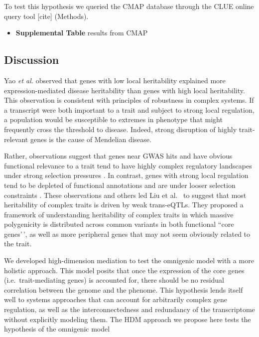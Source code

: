\documentclass[
]{article}
\providecommand{\tightlist}{%
  \setlength{\itemsep}{0pt}\setlength{\parskip}{0pt}}
\begin{document}
To test this hypothesis we queried the CMAP database through the CLUE
online query tool {[}cite{]} (Methods).

\begin{itemize}
\tightlist
\item
  \textbf{Supplemental Table} results from CMAP
\end{itemize}

\subsection{Discussion}\label{discussion}

Yao \textit{et al.} \cite{pmid32424349} observed that genes with low
local heritability explained more expression-mediated disease
heritability than genes with high local heritability. This observation
is consistent with principles of robustness in complex systems. If a
transcript were both important to a trait and subject to strong local
regulation, a population would be susceptible to extremes in phenotype
that might frequently cross the threshold to disease. Indeed, strong
disruption of highly trait-relevant genes is the cause of Mendelian
disease.

Rather, observations suggest that genes near GWAS hits and have obvious
functional relevance to a trait tend to have highly complex regulatory
landscapes under strong selection pressures \cite{pmid37857933}. In
contrast, genes with strong local regulation tend to be depleted of
functional annotations and are under looser selection constraints
\cite{pmid37857933}. These observations and others led Liu et al.~
\cite{pmid31051098} to suggest that most heritability of complex traits
is driven by weak trans-eQTLs. They proposed a framework of
understanding heritability of complex traits in which massive
polygenicity is distributed across common variants in both functional
``core genes'\,', as well as more peripheral genes that may not seem
obviously related to the trait.

We developed high-dimension mediation to test the omnigenic model with a
more holistic approach. This model posits that once the expression of
the core genes (i.e.~trait-mediating genes) is accounted for, there
should be no residual correlation between the genome and the phenome.
This hypothesis lends itself well to systems approaches that can account
for arbitrarily complex gene regulation, as well as the
interconnectedness and redundancy of the transcriptome without
explicitly modeling them. The HDM approach we propose here tests the
hypothesis of the omnigenic model
\end{document}
